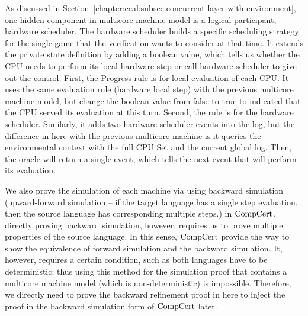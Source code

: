 As discussed in Section~\ref{chapter:ccal:subsec:concurrent-layer-with-environment}, 
one hidden component in multicore machine model is a logical participant, hardware scheduler. 
The hardware scheduler builds a specific scheduling strategy for the single game that the verification wants to consider at that time.  
It extends the private state definition by adding a boolean value, which tells us whether the CPU needs to perform its local hardware step or call hardware scheduler to give out the control. 
First, the \textsf{Progress} rule is for local evaluation of each CPU. It uses the same evaluation rule (hardware local step) with the previous multicore machine model, 
but change the boolean value from false to true to indicated that the CPU served its evaluation at this turn. 
Second, the  rule is for the hardware scheduler.
Similarly, it adds two hardware scheduler events into the log, but the difference in here with the previous multicore machine is it queries the environmental context with the full CPU Set and the current global log. 
Then, the oracle will return a single event, which tells the next event that will perform its evaluation. 


We also prove the simulation of each machine via using backward simulation (upward-forward simulation -- if the target language
has a single step evaluation, then the source language has corresponding multiple steps.) 
in $\mathrm{CompCert}$. 
directly proving backward simulation, however, requires us to prove multiple properties of the source language. 
In this sense, $\mathrm{CompCert}$ provide the way to show the equivalence of forward simulation and the backward simulation. 
It, however, requires a certain condition, such as both languages have to be deterministic;
thus using this method for the simulation proof that contains a multicore machine model (which is non-deterministic) 
is impossible. 
Therefore, we directly need to prove the backward refinement proof in here to inject the proof in the backward simulation form of $\mathrm{CompCert}$ later. 

